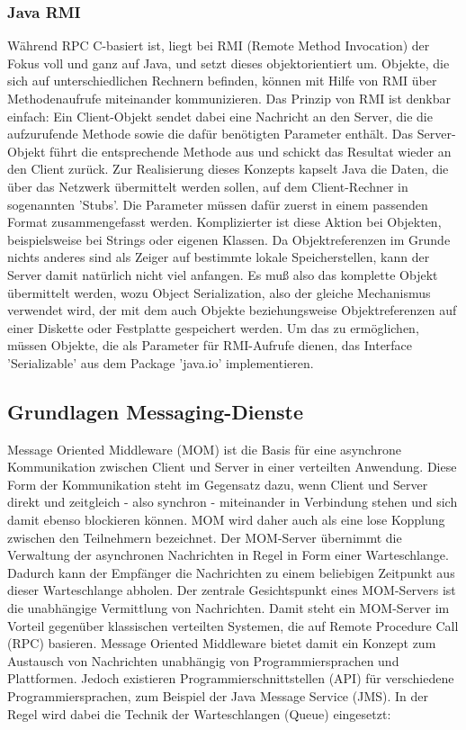 \documentclass[letterpaper, 12pt]{article}
\let\tempsubsection\subsection
\renewcommand\subsection[1]{\vspace{0cm}\tempsubsection{#1}\vspace{0cm}}
\let\tempsubsubsection\subsubsection
\renewcommand\subsubsection[1]{\vspace{0cm}\tempsubsubsection{#1}\vspace{0cm}}
\begin{document}
\subsubsection{Java RMI}

Während RPC C-basiert ist, liegt bei RMI (Remote Method Invocation) der Fokus voll und ganz auf Java, und setzt dieses objektorientiert um. Objekte, die sich auf unterschiedlichen Rechnern befinden, können mit Hilfe von RMI über Methodenaufrufe miteinander kommunizieren. Das Prinzip von RMI ist denkbar einfach: Ein Client-Objekt sendet dabei
eine Nachricht an den Server, die die aufzurufende Methode sowie die dafür
benötigten Parameter enthält. Das Server-Objekt führt die entsprechende
Methode aus und schickt das Resultat wieder an den Client zurück. Zur Realisierung dieses Konzepts kapselt Java die Daten, die über das Netzwerk
übermittelt werden sollen, auf dem Client-Rechner in sogenannten
'Stubs'. Die Parameter müssen dafür zuerst in einem passenden Format
zusammengefasst werden. Komplizierter ist diese Aktion bei Objekten, beispielsweise bei Strings oder
eigenen Klassen. Da Objektreferenzen im Grunde nichts anderes sind als
Zeiger auf bestimmte lokale Speicherstellen, kann der Server damit natürlich
nicht viel anfangen. Es muß also das komplette Objekt übermittelt werden,
wozu Object Serialization, also der gleiche Mechanismus verwendet
wird, der mit dem auch Objekte beziehungsweise Objektreferenzen auf
einer Diskette oder Festplatte gespeichert werden. Um das zu ermöglichen,
müssen Objekte, die als Parameter für RMI-Aufrufe dienen, das Interface
'Serializable' aus dem Package 'java.io' implementieren. \citep{rmi}

\subsection{Grundlagen Messaging-Dienste}

Message Oriented Middleware (MOM) ist die Basis für eine asynchrone Kommunikation zwischen Client und Server in einer verteilten Anwendung. Diese Form der Kommunikation steht im Gegensatz dazu, wenn Client und Server direkt und zeitgleich - also synchron - miteinander in Verbindung stehen und sich damit ebenso blockieren können. MOM wird daher auch als eine lose Kopplung zwischen den Teilnehmern bezeichnet. Der MOM-Server übernimmt die Verwaltung der asynchronen Nachrichten in Regel in Form einer Warteschlange. Dadurch kann der Empfänger die Nachrichten zu einem beliebigen Zeitpunkt aus dieser Warteschlange abholen. Der zentrale Gesichtspunkt eines MOM-Servers ist die unabhängige Vermittlung von Nachrichten. Damit steht ein MOM-Server im Vorteil gegenüber klassischen verteilten Systemen, die auf Remote Procedure Call (RPC) basieren. Message Oriented Middleware bietet damit ein Konzept zum Austausch von Nachrichten unabhängig von Programmiersprachen und Plattformen. Jedoch existieren Programmierschnittstellen (API) für verschiedene Programmiersprachen, zum Beispiel der Java Message Service (JMS). In der Regel wird dabei die Technik der Warteschlangen (Queue) eingesetzt:
\end{document}
